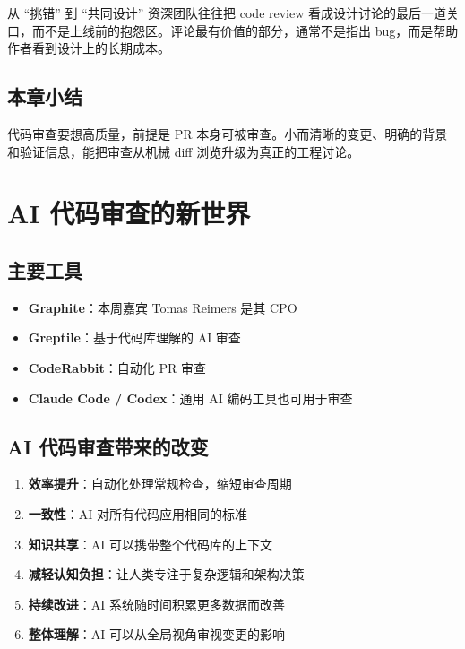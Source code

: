 \documentclass[a4paper]{article}
\begin{document}
\begin{knowledgebox}{从 ``挑错'' 到 ``共同设计''}
资深团队往往把 code review 看成设计讨论的最后一道关口，而不是上线前的抱怨区。评论最有价值的部分，通常不是指出 bug，而是帮助作者看到设计上的长期成本。
\end{knowledgebox}

\subsection{本章小结}

代码审查要想高质量，前提是 PR 本身可被审查。小而清晰的变更、明确的背景和验证信息，能把审查从机械 diff 浏览升级为真正的工程讨论。

\section{AI 代码审查的新世界}

\subsection{主要工具}

\begin{itemize}
    \item \textbf{Graphite}：本周嘉宾 Tomas Reimers 是其 CPO
    \item \textbf{Greptile}：基于代码库理解的 AI 审查
    \item \textbf{CodeRabbit}：自动化 PR 审查
    \item \textbf{Claude Code / Codex}：通用 AI 编码工具也可用于审查
\end{itemize}

\subsection{AI 代码审查带来的改变}

\begin{enumerate}
    \item \textbf{效率提升}：自动化处理常规检查，缩短审查周期
    \item \textbf{一致性}：AI 对所有代码应用相同的标准
    \item \textbf{知识共享}：AI 可以携带整个代码库的上下文
    \item \textbf{减轻认知负担}：让人类专注于复杂逻辑和架构决策
    \item \textbf{持续改进}：AI 系统随时间积累更多数据而改善
    \item \textbf{整体理解}：AI 可以从全局视角审视变更的影响
\end{enumerate}
\end{document}
